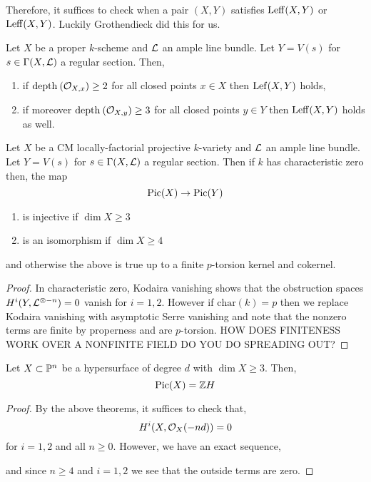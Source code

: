 \documentclass[12pt]{article}
\begin{document}
Therefore, it suffices to check when a pair $(X, Y)$ satisfies $\Leff(X,Y)$ or $\Leff(X,Y)$. Luckily Grothendieck did this for us.

\begin{theorem}
Let $X$ be a proper $k$-scheme and $\L$ an ample line bundle. Let $Y = V(s)$ for $s \in \Gamma(X, \L)$ a regular section. Then,
\begin{enumerate}
\item if $\depth{}{\stalk{X}{x}} \ge 2$ for all closed points $x \in X$ then $\Lef(X,Y)$ holds,
\item if moreover $\depth{}{\stalk{X}{y}} \ge 3$ for all closed points $y \in Y$ then $\Leff(X,Y)$ holds as well.
\end{enumerate}
\end{theorem}

\begin{cor}
Let $X$ be a CM locally-factorial projective $k$-variety and $\L$ an ample line bundle. Let $Y = V(s)$ for $s \in \Gamma(X, \L)$ a regular section. Then if $k$ has characteristic zero then, the map
\[ \Pic{X} \to \Pic{Y} \]
\begin{enumerate}
\item is injective if $\dim{X} \ge 3$
\item is an isomorphism if $\dim{X} \ge 4$
\end{enumerate}
and otherwise the above is true up to a finite $p$-torsion kernel and cokernel.
\end{cor}

\begin{proof}
In characteristic zero, Kodaira vanishing shows that the obstruction spaces $H^i(Y, \L^{\ot -n}) = 0$ vanish for $i = 1,2$. However if $\mathrm{char}(k) = p$ then we replace Kodaira vanishing with asymptotic
Serre vanishing and note that the nonzero terms are finite by properness and are $p$-torsion. {\color{red} HOW DOES FINITENESS WORK OVER A NONFINITE FIELD DO YOU DO SPREADING OUT?}
\end{proof}

\begin{cor}
Let $X \subset \P^n$ be a hypersurface of degree $d$ with $\dim{X} \ge 3$. Then,
\[ \Pic{X} = \Z H \]
\end{cor}

\begin{proof}
By the above theorems, it suffices to check that,
\[ H^i(X, \struct{X}(-nd)) = 0 \]
for $i = 1,2$ and all $n \ge 0$. However, we have an exact sequence,
\begin{center}
\end{center}
and since $n \ge 4$ and $i = 1,2$ we see that the outside terms are zero. 
\end{proof}
\end{document}
